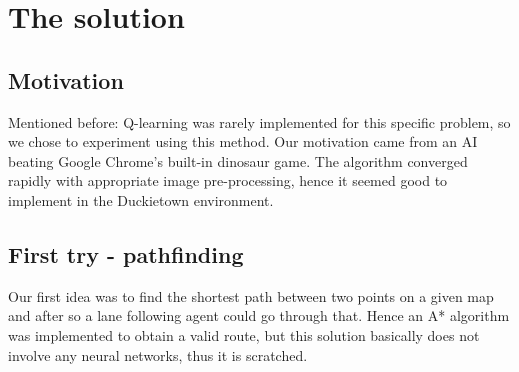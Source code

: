 \documentclass{article}
\begin{document}
\newpage
\section{The solution}
\subsection{Motivation}
Mentioned before: Q-learning was rarely implemented for this specific problem, 
so we chose to experiment using this method. Our motivation came from an AI 
beating Google Chrome's built-in dinosaur game.  The algorithm converged rapidly 
with appropriate image pre-processing, hence it seemed good to implement in the 
Duckietown environment.
\subsection{First try - pathfinding}
Our first idea was to find the shortest path between two points on a given map and after
so a lane following agent could go through that. Hence an A* algorithm was implemented
to obtain a valid route, but this solution basically does not involve any neural networks, thus
it is scratched.
\end{document}
